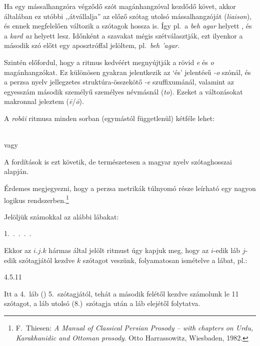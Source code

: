 Ha egy mássalhangzóra végződő szót magánhangzóval kezdődő követ, akkor
általában ez utóbbi ,,átvállalja'' az előző szótag utolsó
mássalhangzóját (\emph{liaison}), és ennek megfelelően változik a
szótagok hossza is. Így pl.~a \emph{beh agar} \metra{\m\b\m} helyett
\metra{\b\b\m}, és a \emph{kard az} \metra{\m\b\m} helyett
\metra{\m\m} lesz. Időnként a szavakat mégis szétválasztják, ezt
ilyenkor a második szó előtt egy aposztróffal jelöltem, pl.~\emph{beh
'agar}.

Szintén előfordul, hogy a ritmus kedvéért megnyújtják a rövid \emph{e}
és \emph{o} magánhangzókat. Ez különösen gyakran jelentkezik az `és'
jelentésű \emph{-o} szónál, és a perzsa nyelv jellegzetes
struktúra-összekötő \emph{-e} szuffixumánál, valamint az egyesszám
második személyű személyes névmásnál (\emph{to}). E\-ze\-ket a
változásokat makronnal jeleztem (\emph{ē}/\emph{ō}).

A \emph{robâi} ritmusa minden sorban (egymástól függetlenül) kétféle
lehet:
\begin{center}
  {\large\metra{\m\m\mbb\s\m\m\mbb\s\m\m\mbb\s\m\cc}}\\
  vagy\\
  {\large\metra{\m\m\mbb\s\m\b\m\b\s\m\m\mbb\s\m\cc}}
\end{center}

A fordítások is ezt követik, de természetesen a magyar nyelv
szótaghosszai alapján.

\begin{center}
\end{center}

Érdemes megjegyezni, hogy a perzsa metrikák túlnyomó része leírható
egy nagyon logikus rendszerben.\footnote{F.~Thiesen: \emph{A Manual of
    Classical Persian Prosody -- with chapters on Urdu, Karakhanidic
    and Ottoman prosody}. Otto Harrassowitz, Wiesbaden, 1982.}

Jelöljük számokkal az alábbi lábakat:
\begin{center}
  1.~\metra{\b\m\m}.~\metra{\b\m\m\m}.~\metra{\b\b\m\m}.~\metra{\b\m\b\m\b\b\m\m}.~\metra{\m\m\b\b\m\b\m\b}
\end{center}

Ekkor az $i.j.k$ hármas által jelölt ritmust úgy kapjuk meg, hogy az
$i$-edik láb $j$-edik szótagjától kezdve $k$ szótagot veszünk,
folyamatosan ismételve a lábat, pl.:
\begin{center}
4{.}5{.}11 \metra{\b\b\m\m\s\b\m\b\m\s\b\b\m}
\end{center}
Itt a 4.~láb (\metra{\b\m\b\m\b\b\m\m}) 5.~szótagjától, tehát a második felétől kezdve
számolunk le 11 szótagot, a láb utolsó (8.)~szótagja után a láb elejétől folytatva.

